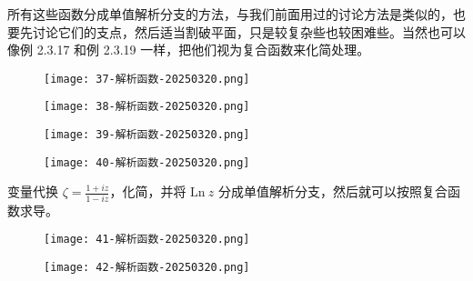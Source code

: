 \begin{note}
所有这些函数分成单值解析分支的方法，与我们前面用过的讨论方法是类似的，也要先讨论它们的支点，然后适当割破平面，只是较复杂些也较困难些。当然也可以像例 2.3.17 和例 2.3.19 一样，把他们视为复合函数来化简处理。
\end{note}
\begin{exercise}
\begin{figure}[H]
\centering
\texttt{[image: 37-解析函数-20250320.png]}
\label{}
\end{figure}
\end{exercise}
\begin{figure}[H]
\centering
\texttt{[image: 38-解析函数-20250320.png]}
\label{}
\end{figure}

\begin{figure}[H]
\centering
\texttt{[image: 39-解析函数-20250320.png]}
\label{}
\end{figure}

\begin{exercise}
\begin{figure}[H]
\centering
\texttt{[image: 40-解析函数-20250320.png]}
\label{}
\end{figure}
\end{exercise}
\begin{note}
变量代换 $\zeta=\frac{1+iz}{1-iz}$，化简，并将 $\mathrm{Ln}\  z$ 分成单值解析分支，然后就可以按照复合函数求导。
\end{note}
\begin{figure}[H]
\centering
\texttt{[image: 41-解析函数-20250320.png]}
\label{}
\end{figure}

\begin{figure}[H]
\centering
\texttt{[image: 42-解析函数-20250320.png]}
\label{}
\end{figure}
